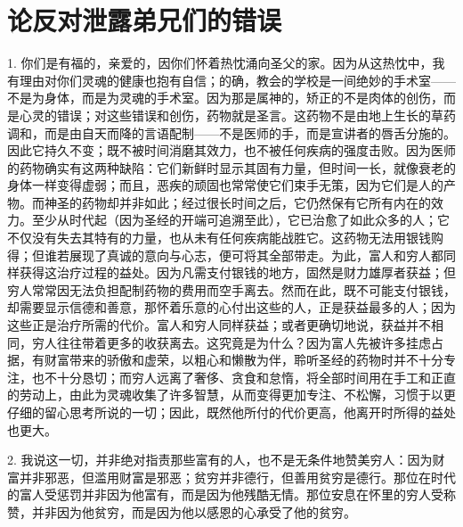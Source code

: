 
\chapter{论反对泄露弟兄们的错误}


1. 你们是有福的，亲爱的，因你们怀着热忱涌向圣父的家。因为从这热忱中，我有理由对你们灵魂的健康也抱有自信；的确，教会的学校是一间绝妙的手术室——不是为身体，而是为灵魂的手术室。因为那是属神的，矫正的不是肉体的创伤，而是心灵的错误；对这些错误和创伤，药物就是圣言。这药物不是由地上生长的草药调和，而是由自天而降的言语配制——不是医师的手，而是宣讲者的唇舌分施的。因此它持久不变；既不被时间消磨其效力，也不被任何疾病的强度击败。因为医师的药物确实有这两种缺陷：它们新鲜时显示其固有力量，但时间一长，就像衰老的身体一样变得虚弱；而且，恶疾的顽固也常常使它们束手无策，因为它们是人的产物。而神圣的药物却并非如此；经过很长时间之后，它仍然保有它所有内在的效力。至少从时代起（因为圣经的开端可追溯至此），它已治愈了如此众多的人；它不仅没有失去其特有的力量，也从未有任何疾病能战胜它。这药物无法用银钱购得；但谁若展现了真诚的意向与心志，便可将其全部带走。为此，富人和穷人都同样获得这治疗过程的益处。因为凡需支付银钱的地方，固然是财力雄厚者获益；但穷人常常因无法负担配制药物的费用而空手离去。然而在此，既不可能支付银钱，却需要显示信德和善意，那怀着乐意的心付出这些的人，正是获益最多的人；因为这些正是治疗所需的代价。富人和穷人同样获益；或者更确切地说，获益并不相同，穷人往往带着更多的收获离去。这究竟是为什么？因为富人先被许多挂虑占据，有财富带来的骄傲和虚荣，以粗心和懒散为伴，聆听圣经的药物时并不十分专注，也不十分恳切；而穷人远离了奢侈、贪食和怠惰，将全部时间用在手工和正直的劳动上，由此为灵魂收集了许多智慧，从而变得更加专注、不松懈，习惯于以更仔细的留心思考所说的一切；因此，既然他所付的代价更高，他离开时所得的益处也更大。\par

2. 我说这一切，并非绝对指责那些富有的人，也不是无条件地赞美穷人：因为财富并非邪恶，但滥用财富是邪恶；贫穷并非德行，但善用贫穷是德行。那位在时代的富人受惩罚并非因为他富有，而是因为他残酷无情。那位安息在怀里的穷人受称赞，并非因为他贫穷，而是因为他以感恩的心承受了他的贫穷。\par

